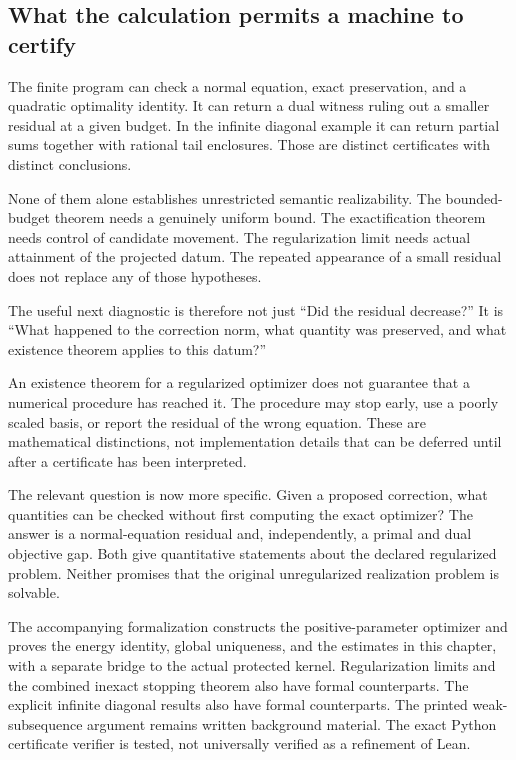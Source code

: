 \subsection{What the calculation permits a machine to certify}
The finite program can check a normal equation, exact preservation, and a quadratic optimality identity. It can return a dual witness ruling out a smaller residual at a given budget. In the infinite diagonal example it can return partial sums together with rational tail enclosures. Those are distinct certificates with distinct conclusions.

None of them alone establishes unrestricted semantic realizability. The bounded-budget theorem needs a genuinely uniform bound. The exactification theorem needs control of candidate movement. The regularization limit needs actual attainment of the projected datum. The repeated appearance of a small residual does not replace any of those hypotheses.

The useful next diagnostic is therefore not just ``Did the residual decrease?'' It is ``What happened to the correction norm, what quantity was preserved, and what existence theorem applies to this datum?''



\label{KS:sec:inexact-repair}
An existence theorem for a regularized optimizer does not guarantee that a numerical procedure has reached it. The procedure may stop early, use a poorly scaled basis, or report the residual of the wrong equation. These are mathematical distinctions, not implementation details that can be deferred until after a certificate has been interpreted.

The relevant question is now more specific. Given a proposed correction, what quantities can be checked without first computing the exact optimizer? The answer is a normal-equation residual and, independently, a primal and dual objective gap. Both give quantitative statements about the declared regularized problem. Neither promises that the original unregularized realization problem is solvable.

\begin{scopebox}
The accompanying formalization constructs the positive-parameter optimizer and proves the energy identity, global uniqueness, and the estimates in this chapter, with a separate bridge to the actual protected kernel. Regularization limits and the combined inexact stopping theorem also have formal counterparts. The explicit infinite diagonal results also have formal counterparts. The printed weak-subsequence argument remains written background material. The exact Python certificate verifier is tested, not universally verified as a refinement of Lean.
\end{scopebox}


